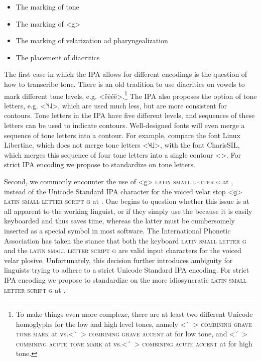 \begin{itemize}
  \item The marking of tone
  \item The marking of <g>
  \item The marking of velarization ad pharyngealization
  \item The placement of diacritics
\end{itemize}

The first case in which the IPA allows for different encodings is the question
of how to transcribe tone. There is an old tradition to use diacritics on vowels
to mark different tone levels, e.g. <ȅèée̋>.\footnote{To make things even more
complexe, there are at least two different Unicode homoglyphs for the low and
high level tones, namely <\ ̀~> \textsc{combining grave tone mark} at
 vs.\@ <\ ̀~> \textsc{combining grave accent} at  for low
tone, and <\ ́~> \textsc{combining acute tone mark} at  vs.\@ <\ ́~>
\textsc{combining acute accent} at  for high tone.} The IPA also
proposes the option of tone letters, e.g. <˥˦˧˨˩>, which are used much less, but
are more consistent for contours. Tone letters in the IPA have five different levels, and
sequences of these letters can be used to indicate contours. Well-designed fonts
will even merge a sequence of tone letters into a contour. For example, compare
the font Linux Libertine, which does not merge tone letters
<{˥˨˧˩}>, with the font CharisSIL, which merges this
sequence of four tone letters into a single contour <>. For strict
IPA encoding we propose to standardize on tone letters.

Second, we commonly encounter the use of <g> \textsc{latin small letter g} at
, instead of the Unicode Standard IPA character for the voiced velar
stop <ɡ> \textsc{latin small letter script g} at . One begins to
question whether this issue is at all apparent to the working linguist, or if
they simply use the  because it is easily keyboarded and thus saves
time, whereas the latter must be cumbersomely inserted as a special symbol in
most software. The International Phonetic Association has taken the stance that
both the keyboard \textsc{latin small letter g} and the \textsc{latin small
letter script g} are valid input characters for the voiced velar plosive.
Unfortunately, this decision further introduces ambiguity for linguists trying
to adhere to a strict Unicode Standard IPA encoding. For strict IPA encoding we
propose to standardize on the more idiosyncratic \textsc{latin small letter
script g} at .

